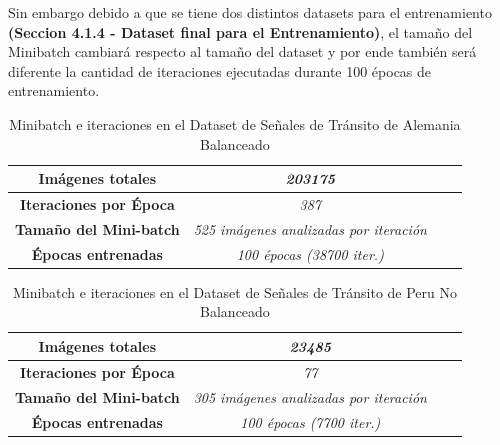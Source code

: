 		Sin embargo debido a que se tiene dos distintos datasets para el entrenamiento \textbf{(Seccion 4.1.4 - Dataset final para el Entrenamiento)}, el tamaño del Minibatch cambiará respecto al tamaño del dataset y por ende también será diferente la cantidad de iteraciones ejecutadas durante 100 épocas de entrenamiento.                        
		

		\begin{table}[H]
			\begin{center}
			\caption{\small{Minibatch e iteraciones en el Dataset de Señales de Tránsito de Alemania Balanceado}}
			\begin{tabular}{|>{\scriptsize}c|>{\scriptsize}c|>{\scriptsize}c|>{\scriptsize}c|}
			\hline
			\textbf{Imágenes totales }                 &\textit{203175}                       \\ \hline
			\textbf{Iteraciones por Época}                 &\textit{387}                             \\ \hline
			\textbf{Tamaño del Mini-batch}                 &\textit{525 imágenes analizadas por iteración}                       \\ \hline
			\textbf{Épocas entrenadas}                &\textit{100 épocas (38700 iter.)}                       \\ \hline
			\end{tabular}
			\end{center}
		\end{table}


		\begin{table}[H]
			\begin{center}
			\caption{\small{Minibatch e iteraciones en el Dataset de Señales de Tránsito de Peru No Balanceado}}
			\begin{tabular}{|>{\scriptsize}c|>{\scriptsize}c|>{\scriptsize}c|>{\scriptsize}c|}
			\hline
			\textbf{Imágenes totales }                 &\textit{23485}                       \\ \hline
			\textbf{Iteraciones por Época}                 &\textit{77}                             \\ \hline
			\textbf{Tamaño del Mini-batch}                 &\textit{305 imágenes analizadas por iteración}                       \\ \hline
			\textbf{Épocas entrenadas}                &\textit{100 épocas (7700 iter.)}                       \\ \hline
			\end{tabular}
			\end{center}
		\end{table}

